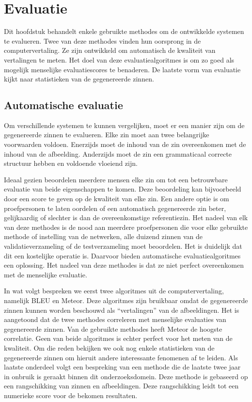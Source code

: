 \chapter{Evaluatie}
\label{hoofdstuk:evaluatie}
Dit hoofdstuk behandelt enkele gebruikte methodes om de ontwikkelde systemen te evalueren. Twee van deze methodes vinden hun oorsprong in de computervertaling. Ze zijn ontwikkeld om automatisch de kwaliteit van vertalingen te meten. Het doel van deze evaluatiealgoritmes is om zo goed als mogelijk menselijke evaluatiescores te benaderen. De laatste vorm van evaluatie kijkt naar statistieken van de gegenereerde zinnen.


\section{Automatische evaluatie}
Om verschillende systemen te kunnen vergelijken, moet er een manier zijn om de gegenereerde zinnen te evalueren. Elke zin moet aan twee belangrijke voorwaarden voldoen. Enerzijds moet de inhoud van de zin overeenkomen met de inhoud van de afbeelding. Anderzijds moet de zin een grammaticaal correcte structuur hebben en voldoende vloeiend zijn.

Ideaal gezien beoordelen meerdere mensen elke zin om tot een betrouwbare evaluatie van beide eigenschappen te komen. Deze beoordeling kan bijvoorbeeld door een score te geven op de kwaliteit van elke zin. Een andere optie is om proefpersonen te laten oordelen of een automatisch gegenereerde zin beter, gelijkaardig of slechter is dan de overeenkomstige referentiezin. Het nadeel van elk van deze methodes is de nood aan meerdere proefpersonen die voor elke gebruikte methode of instelling van de netwerken, alle duizend zinnen van de validatieverzameling of de testverzameling moet beoordelen. Het is duidelijk dat dit een kostelijke operatie is. Daarvoor bieden automatische evaluatiealgoritmes een oplossing. Het nadeel van deze methodes is dat ze niet perfect overeenkomen met de menselijke evaluatie.

In wat volgt bespreken we eerst twee algoritmes uit de computervertaling, namelijk BLEU en Meteor.\cite{Papineni2001,Denkowski2007a} Deze algoritmes zijn bruikbaar omdat de gegenereerde zinnen kunnen worden beschouwd als ``vertalingen'' van de afbeeldingen. Het is aangetoond dat de twee methodes correleren met menselijke evaluaties van gegenereerde zinnen. Van de gebruikte methodes heeft Meteor de hoogste correlatie. \cite{Elliott2014}
Geen van beide algoritmes is echter perfect voor het meten van de kwaliteit.
Om die reden bekijken we ook nog enkele statistieken van de gegenereerde zinnen om hieruit andere interessante fenomenen af te leiden.
Als laatste onderdeel volgt een bespreking van een methode die de laatste twee jaar in onbruik is geraakt binnen dit onderzoeksdomein. Deze methode is gebaseerd op een rangschikking van zinnen en afbeeldingen. Deze rangschikking leidt tot een numerieke score voor de bekomen resultaten.

